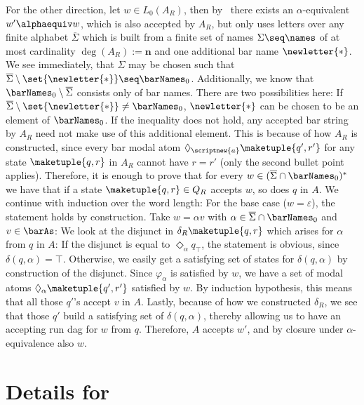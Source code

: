 \documentclass[10pt, final, conference, a4paper, twocolumn]{IEEEtran}
\begin{document}
\begin{IEEEproof}
  For the other direction, let $w \in L_0(A_R)$, then by~ there exists an
  $\alpha$-equivalent $w' \alphaequiv w$, which is also accepted by $A_R$, but only uses letters over any finite
  alphabet $\overline{\Sigma}$ which is built from a finite set of names $\Sigma \seq
  \names$ of at most cardinality $\deg(A_R) := \mathbf{n}$ and one additional bar name $\newletter{\ast}$.
  We see immediately, that $\Sigma$ may be chosen such that $\overline{\Sigma} \setminus \set{\newletter{\ast}}
  \seq \barNames_0$. Additionally, we know that $\barNames_0 \setminus \overline{\Sigma}$ consists only of
  bar names. There are two possibilities here: If $\overline{\Sigma} \setminus \set{\newletter{\ast}} \neq
  \barNames_0$, $\newletter{\ast}$ can be chosen to be an element of $\barNames_0$. If the inequality
  does not hold, any accepted bar string by $A_R$ need not make use of this additional element.
  This is because of how $A_R$ is constructed, since every bar modal atom $\Diamond_{\scriptnew{a}} \maketuple{q',r'}$
  for any state $\maketuple{q, r}$ in $A_R$ cannot have $r = r'$ (only the second bullet point applies).
  Therefore, it is enough to prove that for every $w \in (\overline{\Sigma} \cap \barNames_0)^*$ we have that
  if a state $\maketuple{q, r} \in Q_R$ accepts $w$, so does $q$ in $A$. We continue with induction over
  the word length: For the base case ($w = \varepsilon$), the statement holds by construction. Take
  $w = \alpha v$ with $\alpha \in \overline{\Sigma} \cap \barNames_0$ and $v \in \barAs$: We look at the
  disjunct in $\delta_R\maketuple{q, r}$ which arises for $\alpha$ from $q$ in $A$: If the disjunct is equal
  to $\Diamond_\alpha q_{\top}$, the statement is obvious, since $\delta(q, \alpha) = \top$. Otherwise,
  we easily get a satisfying set of states for $\delta(q, \alpha)$ by construction of the disjunct. 
  Since $\varphi_{\alpha}$ is satisfied by $w$, we have a set of modal atoms $\Diamond_{\alpha}
  \maketuple{q', r'}$ satisfied by $w$. By induction hypothesis, this means that all those
  $q'$'s accept $v$ in $A$. Lastly, because of how we constructed $\delta_{R}$, we see that
  those $q'$ build a satisfying set of $\delta(q, \alpha)$, thereby allowing us to have an
  accepting run dag for $w$ from $q$. Therefore, $A$ accepts $w'$, and by closure under
  $\alpha$-equivalence also $w$.
\end{IEEEproof}

\section{Details for~} \label{app:secDA}
\end{document}
